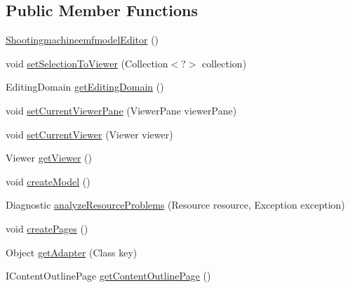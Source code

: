 \subsection*{Public Member Functions}
\begin{DoxyCompactItemize}
\item 
\hyperlink{classshootingmachineemfmodel_1_1presentation_1_1_shootingmachineemfmodel_editor_a2bb1159386a5ec27a3b21134eabfee13}{Shootingmachineemfmodel\-Editor} ()
\item 
void \hyperlink{classshootingmachineemfmodel_1_1presentation_1_1_shootingmachineemfmodel_editor_afd40afb2e7fe8b50f51bd2c5ecfc6abf}{set\-Selection\-To\-Viewer} (Collection$<$?$>$ collection)
\item 
Editing\-Domain \hyperlink{classshootingmachineemfmodel_1_1presentation_1_1_shootingmachineemfmodel_editor_a152626cba68b864154666b91f258ae1d}{get\-Editing\-Domain} ()
\item 
void \hyperlink{classshootingmachineemfmodel_1_1presentation_1_1_shootingmachineemfmodel_editor_a785850dcf8df2591d68d135121410842}{set\-Current\-Viewer\-Pane} (Viewer\-Pane viewer\-Pane)
\item 
void \hyperlink{classshootingmachineemfmodel_1_1presentation_1_1_shootingmachineemfmodel_editor_ad3ebb22cb0372ce82ca62d9aa17af298}{set\-Current\-Viewer} (Viewer viewer)
\item 
Viewer \hyperlink{classshootingmachineemfmodel_1_1presentation_1_1_shootingmachineemfmodel_editor_afcc89538edec93bd7a44daa97a26b5a6}{get\-Viewer} ()
\item 
void \hyperlink{classshootingmachineemfmodel_1_1presentation_1_1_shootingmachineemfmodel_editor_ac823806e1bdab1df7b839e782551b48a}{create\-Model} ()
\item 
Diagnostic \hyperlink{classshootingmachineemfmodel_1_1presentation_1_1_shootingmachineemfmodel_editor_a1a3e7a562f3796edee18f95ff0c404bc}{analyze\-Resource\-Problems} (Resource resource, Exception exception)
\item 
void \hyperlink{classshootingmachineemfmodel_1_1presentation_1_1_shootingmachineemfmodel_editor_aad44329f9c1232e53df7b3a1f4231548}{create\-Pages} ()
\item 
Object \hyperlink{classshootingmachineemfmodel_1_1presentation_1_1_shootingmachineemfmodel_editor_a6596292e18bc323e4dc85b7bf5ebd9d0}{get\-Adapter} (Class key)
\item 
I\-Content\-Outline\-Page \hyperlink{classshootingmachineemfmodel_1_1presentation_1_1_shootingmachineemfmodel_editor_ab9606968dcf7fc12592f3361884f4239}{get\-Content\-Outline\-Page} ()

\end{DoxyCompactItemize}
